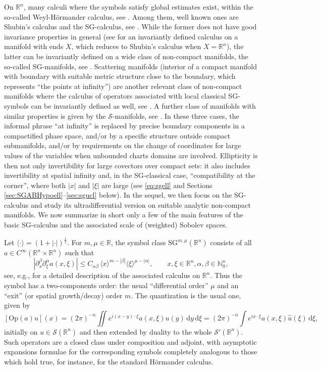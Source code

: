 \documentclass[11pt,reqno]{amsart}
\numberwithin{equation}{section}
\newcommand{\dy}{{\mathrm{d}y}}
\newcommand{\dxi}{{\mathrm{d}\xi}}
\newcommand{\R}{{\mathbb{R}}} %
\newcommand{\N}{{\mathbb{N}}} %
\newcommand{\Op}{{\mathrm{Op}}}
\newcommand{\SG}{{\mathrm{SG}}}
\begin{document}
On $\R^n$, many calculi where the symbols satisfy global estimates exist, 
within the so-called Weyl-H\"ormander calculus, see \cite[Ch. XVIII]{Hormander_3}.
Among them, well known ones are Shubin's calculus and the SG-calculus, see \cite{Cordes76,cordes,NicRod,Parenti1972,Shubin1987}. 
While the former does not have good invariance properties in general (see \cite{Krainer} for an invariantly defined 
calculus on a manifold with ends $X$, which reduces to Shubin's calculus when $X=\R^n$), the latter can be invariantly 
defined on a wide class of non-compact manifolds, the so-called SG-manifolds, see \cite{Schrohe86}.
Scattering manifolds (interior of a compact manifold with boundary with suitable metric structure close to the boundary, which represents ``the points at infinity'') are 
another relevant class of non-compact manifolds where the calculus of operators associated with local classical SG-symbols can be invariantly defined as well, see \cite{Melrose_GST,Melrose1996}. A further class of manifolds with similar properties is given by the $\mathcal{S}$-manifolds, see \cite[Ch. 4]{cordes}.
In these three cases, the informal phrase ``at infinity'' is replaced by precise boundary components in a compactified phase space, and/or by a specific structure outside
compact submanifolds, and/or by requirements on the change of coordinates for large values of the variables when unbounded charts domains are involved. 
Ellipticity is then not only invertibility for large covectors over compact sets: it also includes invertibility at spatial infinity and, in the SG-classical case, 
``compatibility at the corner'', where both $|x|$ and $|\xi|$ are large (see \eqref{eq:sgell} and Sections \ref{sec:SGABHypoell}--\ref{sec:sgucl} below). 
In the sequel, we then focus on the SG-calculus and study its ultradifferential version on suitable 
analytic non-compact manifolds. We now summarize in short only a few of the
main features of the basic SG-calculus and the associated scale of (weighted) Sobolev spaces. 

Let $\langle\cdot\rangle = (1+|\cdot|)^{\frac{1}{2}}$. For $m,\mu\in\R$, the symbol class $\SG^{m,\mu}(\R^n)$ consists of all $a\in C^\infty(\R^n\times\R^n)$ such that 
%
\begin{equation}\label{eq:sg-symbol}
  |\partial_x^\beta\partial_\xi^\alpha a(x,\xi)|
  \leq C_{\alpha\beta}\,\langle x\rangle^{m-|\beta|}\langle \xi\rangle^{\mu-|\alpha|},
  \qquad x,\xi\in\R^n, \alpha,\beta\in\N^n_0,
\end{equation}
%
see, e.g., \cite{cordes,NicRod} for a detailed description of the associated calculus on $\R^n$. Thus the symbol has a two-components order: 
the usual ``differential order'' $\mu$ and 
an ``exit'' (or spatial growth/decay) order $m$. The quantization is the usual one, given by
%
\[
  [\Op(a)u](x)=(2\pi)^{-n}\iint e^{i(x-y)\cdot\xi}a(x,\xi)u(y)\,\dy\,\dxi=(2\pi)^{-n}\int e^{ix\cdot\xi}a(x,\xi)\widehat{u}(\xi)\,\dxi,
\]
%
initially on $u\in\mathcal S(\R^n)$ and then extended by duality to the whole $\mathcal S'(\R^n)$. Such operators are a closed class under composition and adjoint,
with asymptotic expansions formulae for the corresponding symbols completely analogous to those which hold true, for instance, for the standard H\"ormander calculus.
\end{document}
